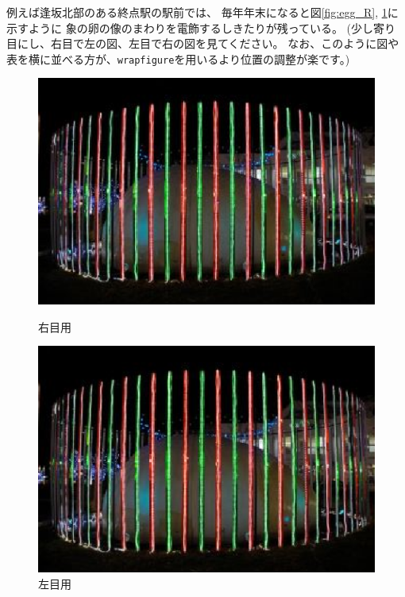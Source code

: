\documentclass[11pt,a4paper,twoside]{jarticle}
\newcommand{\研究種別}{A}	%
\newcommand{\研究課題名}{コ・クリエイティブなソフトウェア開発者を育成するPBL型教育}
\newcommand{\研究機関名}{産業技術大学院大学}
\newcommand{\研究代表者氏名}{中鉢　欣秀}
\newcommand{\研究代表者氏名ふりがな}{ちゅうばち　よしひで}
\newcommand{\本応募effort}{\KLEffort{18}}	%
\newcommand{\研究期間の最終元号年度}{27}	%
\begin{document}
{	例えば逢坂北部のある終点駅の駅前では、
	毎年年末になると図\ref{fig:egg_R}, \ref{fig:egg_L}に示すように
	象の卵の像のまわりを電飾するしきたりが残っている。
	(少し寄り目にし、右目で左の図、左目で右の図を見てください。
	なお、このように図や表を横に並べる方が、{\tt wrapfigure}を用いるより位置の調整が楽です。)
        \begin{figure}[h]
         	\begin{minipage}[t]{0.49\linewidth}
			\includegraphics[width=\linewidth]{figs/egg_R.eps}
			\caption{右目用}
			\label{fig:egg_R}
		\end{minipage}
		\hspace{0.01\linewidth}
		\begin{minipage}[t]{0.49\linewidth}
			\includegraphics[width=\linewidth]{figs/egg_L.eps}
			\caption{左目用}
			\label{fig:egg_L}
		\end{minipage}
         \end{figure}

}
\end{document}
